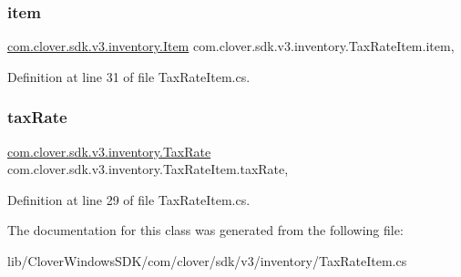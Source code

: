 \subsubsection{\texorpdfstring{item}{item}}
{\footnotesize\ttfamily \hyperlink{classcom_1_1clover_1_1sdk_1_1v3_1_1inventory_1_1_item}{com.\+clover.\+sdk.\+v3.\+inventory.\+Item} com.\+clover.\+sdk.\+v3.\+inventory.\+Tax\+Rate\+Item.\+item\hspace{0.3cm}{\ttfamily [get]}, {\ttfamily [set]}}



Definition at line 31 of file Tax\+Rate\+Item.\+cs.

\mbox{\label{classcom_1_1clover_1_1sdk_1_1v3_1_1inventory_1_1_tax_rate_item_a7003ea33a4a4bbd1f03d1149d44269ed}} 
\subsubsection{\texorpdfstring{tax\+Rate}{taxRate}}
{\footnotesize\ttfamily \hyperlink{classcom_1_1clover_1_1sdk_1_1v3_1_1inventory_1_1_tax_rate}{com.\+clover.\+sdk.\+v3.\+inventory.\+Tax\+Rate} com.\+clover.\+sdk.\+v3.\+inventory.\+Tax\+Rate\+Item.\+tax\+Rate\hspace{0.3cm}{\ttfamily [get]}, {\ttfamily [set]}}



Definition at line 29 of file Tax\+Rate\+Item.\+cs.



The documentation for this class was generated from the following file\+:\begin{DoxyCompactItemize}
\item 
lib/\+Clover\+Windows\+S\+D\+K/com/clover/sdk/v3/inventory/Tax\+Rate\+Item.\+cs\end{DoxyCompactItemize}
